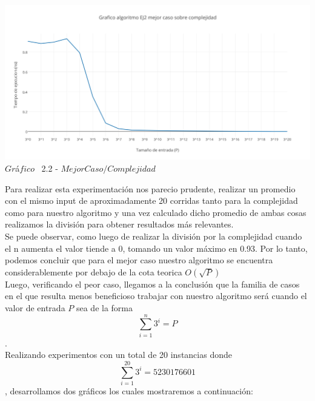 \vspace*{0.3cm} \vspace*{0.3cm}
  \begin{center}
\includegraphics[scale=0.65]{./EJ2/mejorcaso1.png}
{$Gr$\'a$fico$ \ 2.2 - $Mejor Caso / Complejidad$}
  \end{center}
  \vspace*{0.3cm}

Para realizar esta experimentaci\'on nos parecio prudente, realizar un promedio con el mismo input de aproximadamente 20 corridas
tanto para la complejidad como para nuestro algoritmo y una vez calculado dicho promedio de ambas cosas realizamos la divisi\'on para
obtener resultados m\'as relevantes.\\ 

Se puede observar, como luego de realizar la divisi\'on por la complejidad cuando el n aumenta el valor tiende a 0, tomando un valor m\'aximo en 0.93. Por lo tanto, podemos concluir que para el mejor caso nuestro algoritmo se encuentra considerablemente por debajo de la cota teorica $O(\sqrt{P})$\\

Luego, verificando el peor caso, llegamos a la conclusi\'on que la familia de casos en el que resulta menos beneficioso trabajar con nuestro algoritmo ser\'a cuando el valor de entrada $P$ sea de la forma \[
\sum_{i=1}^{n}3^{i}=P 
\].
\\

Realizando experimentos con un total de 20 instancias donde \[
\sum_{i=1}^{20}3^{i}=5230176601 
\], desarrollamos dos gr\'aficos los cuales mostraremos a continuaci\'on: \\

